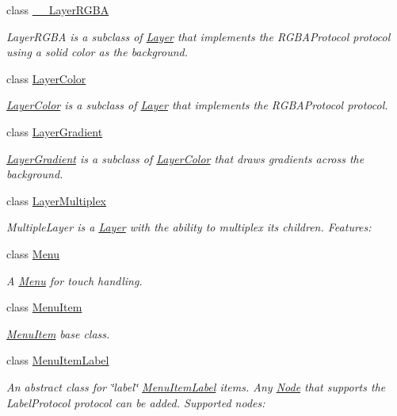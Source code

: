 \begin{DoxyCompactItemize}
class \hyperlink{class____LayerRGBA}{\+\_\+\+\_\+\+Layer\+R\+G\+BA}
\begin{DoxyCompactList}\small\item\em Layer\+R\+G\+BA is a subclass of \hyperlink{classLayer}{Layer} that implements the R\+G\+B\+A\+Protocol protocol using a solid color as the background. \end{DoxyCompactList}\item 
class \hyperlink{classLayerColor}{Layer\+Color}
\begin{DoxyCompactList}\small\item\em \hyperlink{classLayerColor}{Layer\+Color} is a subclass of \hyperlink{classLayer}{Layer} that implements the R\+G\+B\+A\+Protocol protocol. \end{DoxyCompactList}\item 
class \hyperlink{classLayerGradient}{Layer\+Gradient}
\begin{DoxyCompactList}\small\item\em \hyperlink{classLayerGradient}{Layer\+Gradient} is a subclass of \hyperlink{classLayerColor}{Layer\+Color} that draws gradients across the background. \end{DoxyCompactList}\item 
class \hyperlink{classLayerMultiplex}{Layer\+Multiplex}
\begin{DoxyCompactList}\small\item\em Multiple\+Layer is a \hyperlink{classLayer}{Layer} with the ability to multiplex it\textquotesingle{}s children. Features\+: \end{DoxyCompactList}\item 
class \hyperlink{classMenu}{Menu}
\begin{DoxyCompactList}\small\item\em A \hyperlink{classMenu}{Menu} for touch handling. \end{DoxyCompactList}\item 
class \hyperlink{classMenuItem}{Menu\+Item}
\begin{DoxyCompactList}\small\item\em \hyperlink{classMenuItem}{Menu\+Item} base class. \end{DoxyCompactList}\item 
class \hyperlink{classMenuItemLabel}{Menu\+Item\+Label}
\begin{DoxyCompactList}\small\item\em An abstract class for \char`\"{}label\char`\"{} \hyperlink{classMenuItemLabel}{Menu\+Item\+Label} items. Any \hyperlink{classNode}{Node} that supports the Label\+Protocol protocol can be added. Supported nodes\+: \end{DoxyCompactList}\item 

\end{DoxyCompactItemize}
